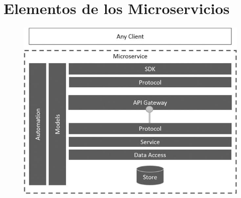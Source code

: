 \documentclass[12pt, twoside, openright]{report} %
\begin{document}
\section{Elementos de los Microservicios}

\begin{figure}[H]
	{\includegraphics[scale=.8]{9781484212769_Fig03-04.jpg}}
\end{figure}
\end{document}
